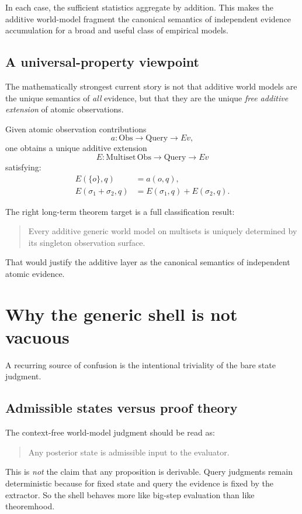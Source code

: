 \documentclass[11pt]{article}
\begin{document}
In each case, the sufficient statistics aggregate by addition.  This makes the
additive world-model fragment the canonical semantics of independent evidence
accumulation for a broad and useful class of empirical models.

\subsection{A universal-property viewpoint}

The mathematically strongest current story is not that additive world models are
the unique semantics of \emph{all} evidence, but that they are the unique
\emph{free additive extension} of atomic observations.

Given atomic observation contributions
\[
  a : \mathrm{Obs} \to \mathrm{Query} \to Ev,
\]
one obtains a unique additive extension
\[
  E : \mathrm{Multiset}\,\mathrm{Obs} \to \mathrm{Query} \to Ev
\]
satisfying:
\begin{align*}
E(\{o\},q) &= a(o,q), \\
E(\sigma_1 + \sigma_2,q) &= E(\sigma_1,q)+E(\sigma_2,q).
\end{align*}

The right long-term theorem target is a full classification result:
\begin{quote}
Every additive generic world model on multisets is uniquely determined by its
singleton observation surface.
\end{quote}

That would justify the additive layer as the canonical semantics of independent
atomic evidence.

\section{Why the generic shell is not vacuous}

A recurring source of confusion is the intentional triviality of the bare state
judgment.

\subsection{Admissible states versus proof theory}

The context-free world-model judgment should be read as:
\begin{quote}
Any posterior state is admissible input to the evaluator.
\end{quote}

This is \emph{not} the claim that any proposition is derivable.  Query
judgments remain deterministic because for fixed state and query the evidence is
fixed by the extractor.  So the shell behaves more like big-step evaluation than
like theoremhood.
\end{document}
